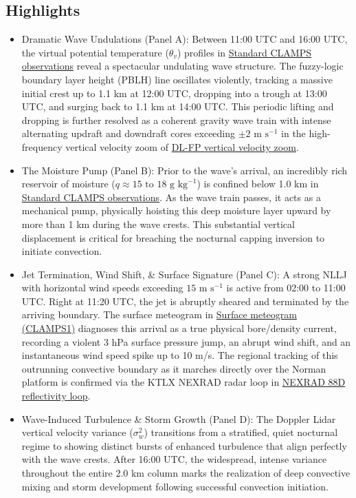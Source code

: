 \documentclass[11pt]{article}
\begin{document}
\subsection*{Highlights}
\begin{itemize}
  \item Dramatic Wave Undulations (Panel A): Between 11:00 UTC and 16:00 UTC, the virtual potential temperature ($\theta_v$) profiles in \hyperref[fig:ci_gravity_waves_c1:ci_c1_instrument_template_4panel]{Standard CLAMPS observations} reveal a spectacular undulating wave structure. The fuzzy-logic boundary layer height (PBLH) line oscillates violently, tracking a massive initial crest up to 1.1 km at 12:00 UTC, dropping into a trough at 13:00 UTC, and surging back to 1.1 km at 14:00 UTC. This periodic lifting and dropping is further resolved as a coherent gravity wave train with intense alternating updraft and downdraft cores exceeding $\pm 2\text{ m s}^{-1}$ in the high-frequency vertical velocity zoom of \hyperref[fig:ci_gravity_waves_c1:ci_c1_aux_dlfp_w_zoom_timeheight]{DL-FP vertical velocity zoom}.
  \item The Moisture Pump (Panel B): Prior to the wave's arrival, an incredibly rich reservoir of moisture ($q \approx 15\text{ to }18\text{ g kg}^{-1}$) is confined below 1.0 km in \hyperref[fig:ci_gravity_waves_c1:ci_c1_instrument_template_4panel]{Standard CLAMPS observations}. As the wave train passes, it acts as a mechanical pump, physically hoisting this deep moisture layer upward by more than 1 km during the wave crests. This substantial vertical displacement is critical for breaching the nocturnal capping inversion to initiate convection.
  \item Jet Termination, Wind Shift, \& Surface Signature (Panel C): A strong NLLJ with horizontal wind speeds exceeding $15\text{ m s}^{-1}$ is active from 02:00 to 11:00 UTC. Right at 11:20 UTC, the jet is abruptly sheared and terminated by the arriving boundary. The surface meteogram in \hyperref[fig:ci_gravity_waves_c1:ci_c1_aux_surface_meteogram]{Surface meteogram (CLAMPS1)} diagnoses this arrival as a true physical bore/density current, recording a violent 3 hPa surface pressure jump, an abrupt wind shift, and an instantaneous wind speed spike up to 10 m/s. The regional tracking of this outrunning convective boundary as it marches directly over the Norman platform is confirmed via the KTLX NEXRAD radar loop in \hyperref[fig:ci_gravity_waves_c1:ci_c1_20200730_88dloop]{NEXRAD 88D reflectivity loop}.
  \item Wave-Induced Turbulence \& Storm Growth (Panel D): The Doppler Lidar vertical velocity variance ($\sigma_w^2$) transitions from a stratified, quiet nocturnal regime to showing distinct bursts of enhanced turbulence that align perfectly with the wave crests. After 16:00 UTC, the widespread, intense variance throughout the entire 2.0 km column marks the realization of deep convective mixing and storm development following successful convection initiation.
\end{itemize}
\end{document}
